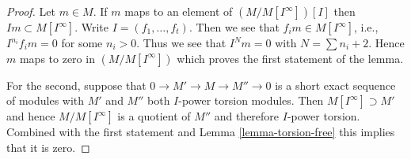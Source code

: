 \documentclass[10pt,a4paper]{amsart}
\theoremstyle{plain}
\theoremstyle{definition}
\theoremstyle{remark}
\numberwithin{equation}{subsection}
\begin{document}
\begin{proof}
Let $m \in M$. If $m$ maps to an element of $(M/M[I^\infty])[I]$
then $Im \subset M[I^\infty]$.
Write $I = (f_1, \ldots, f_t)$. Then we see that
$f_i m \in M[I^\infty]$, i.e., $I^{n_i}f_i m = 0$ for some $n_i > 0$.
Thus we see that $I^Nm = 0$ with $N = \sum n_i + 2$.
Hence $m$ maps to zero in $(M/M[I^\infty])$ which proves the
first statement of the lemma.

\medskip\noindent
For the second, suppose that $0 \to M' \to M \to M'' \to 0$ is a short
exact sequence of modules with $M'$ and $M''$ both $I$-power torsion
modules. Then $M[I^\infty] \supset M'$ and hence $M/M[I^\infty]$ is a
quotient of $M''$ and therefore $I$-power torsion. Combined with
the first statement and Lemma \ref{lemma-torsion-free} this implies
that it is zero.
\end{proof}
\end{document}
